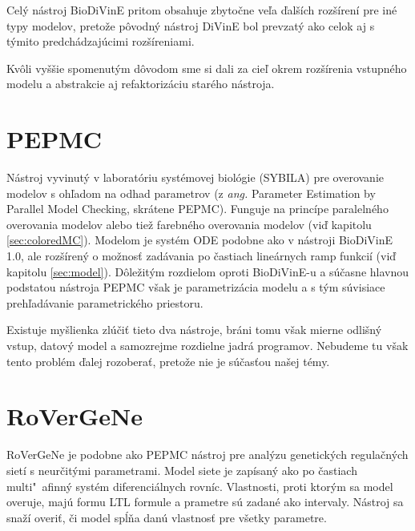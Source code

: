 \documentclass[11pt,final,oneside]{fithesis}
\begin{document}
Cel\'y n\'astroj BioDiVinE pritom obsahuje zbyto\v cne ve\v la \v dal\v s\'ich roz\v s\'iren\'i pre in\'e typy modelov, preto\v ze p\^ ovodn\'y n\'astroj 
DiVinE bol prevzat\'y ako celok aj s t\'ymito predch\'adzaj\'ucimi roz\v s\'ireniami.

Kv\^ oli vy\v s\v sie spomenut\'ym d\^ ovodom sme si dali za cie\v l okrem roz\v s\'irenia vstupn\'eho modelu a abstrakcie aj refaktoriz\'aciu star\'eho n\'astroja.
\cite{BIODIVINE}

\section{PEPMC}
N\'astroj vyvinut\'y v laborat\'oriu syst\'emovej biol\'ogie (SYBILA)\cite{sybila} pre overovanie modelov s oh\v ladom na odhad parametrov (z \textit{ang.}
Parameter Estimation by Parallel Model Checking, skr\'atene PEPMC). Funguje na princ\'ipe paraleln\'eho overovania modelov alebo tie\v z farebn\'eho 
overovania modelov (vi\v d kapitolu \ref{sec:coloredMC}). Modelom je syst\'em ODE podobne ako v n\'astroji BioDiVinE 1.0, ale roz\v s\'iren\'y o mo\v znos\v t
zad\'avania po \v castiach line\'arnych ramp funkci\'i (vi\v d kapitolu \ref{sec:model}). D\^ ole\v zit\'ym rozdielom oproti BioDiVinE-u a s\'u\v casne hlavnou
podstatou n\'astroja PEPMC v\v sak je parametriz\'acia modelu a s t\'ym s\'uvisiace preh\v lad\'avanie parametrick\'eho priestoru.

Existuje my\v slienka zl\'u\v ci\v t tieto dva n\'astroje, br\'ani tomu v\v sak mierne odli\v sn\'y vstup, datov\'y model a samozrejme rozdielne jadr\'a 
programov. Nebudeme tu v\v sak tento probl\'em \v dalej rozobera\v t, preto\v ze nie je s\'u\v cas\v tou na\v sej t\'emy.
\cite{HIBI-2010}

\section{RoVerGeNe}
RoVerGeNe je podobne ako PEPMC n\'astroj pre anal\'yzu genetick\'ych regula\v cn\'ych siet\'i s neur\v cit\'ymi parametrami. Model siete je zap\'isan\'y ako
po \v castiach multi"~afinn\'y syst\'em diferenci\'alnych rovn\'ic. Vlastnosti, proti ktor\'ym sa model overuje, maj\'u formu LTL formule a prametre s\'u 
zadan\'e ako intervaly. N\'astroj sa sna\v z\'i overi\v t, \v ci model sp\'l\v na dan\'u vlastnos\v t pre v\v setky parametre.
\end{document}
